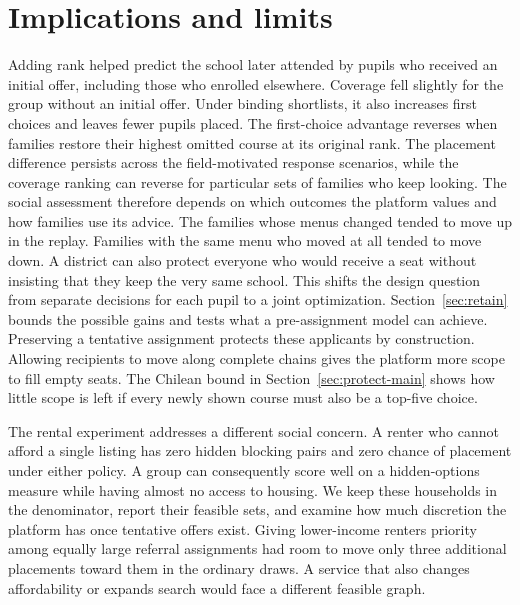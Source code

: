\section{Implications and limits}\label{sec:limits}
Adding rank helped predict the school later attended by pupils who received an initial offer, including those who enrolled elsewhere. Coverage fell slightly for the group without an initial offer. Under binding shortlists, it also increases first choices and leaves fewer pupils placed. The first-choice advantage reverses when families restore their highest omitted course at its original rank. The placement difference persists across the field-motivated response scenarios, while the coverage ranking can reverse for particular sets of families who keep looking. The social assessment therefore depends on which outcomes the platform values and how families use its advice. The families whose menus changed tended to move up in the replay. Families with the same menu who moved at all tended to move down. A district can also protect everyone who would receive a seat without insisting that they keep the very same school. This shifts the design question from separate decisions for each pupil to a joint optimization. Section~\ref{sec:retain} bounds the possible gains and tests what a pre-assignment model can achieve. Preserving a tentative assignment protects these applicants by construction. Allowing recipients to move along complete chains gives the platform more scope to fill empty seats. The Chilean bound in Section~\ref{sec:protect-main} shows how little scope is left if every newly shown course must also be a top-five choice.

The rental experiment addresses a different social concern. A renter who cannot afford a single listing has zero hidden blocking pairs and zero chance of placement under either policy. A group can consequently score well on a hidden-options measure while having almost no access to housing. We keep these households in the denominator, report their feasible sets, and examine how much discretion the platform has once tentative offers exist. Giving lower-income renters priority among equally large referral assignments had room to move only three additional placements toward them in the ordinary draws. A service that also changes affordability or expands search would face a different feasible graph.

